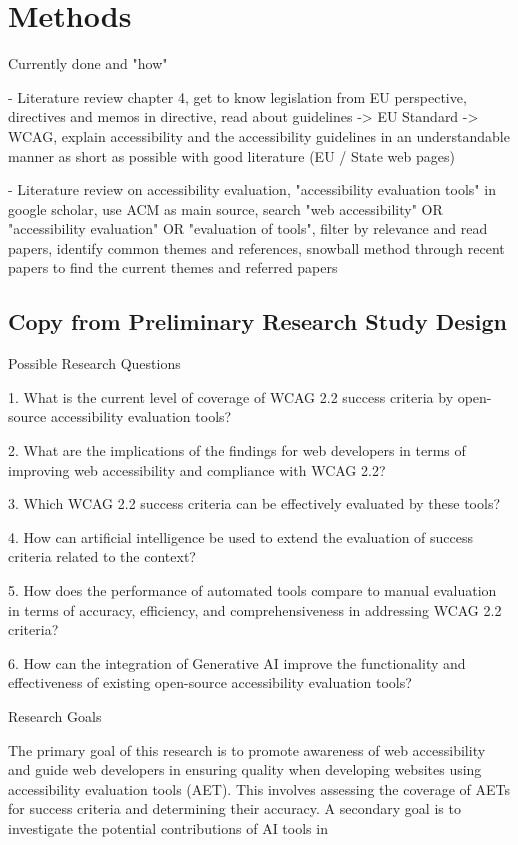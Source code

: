 \chapter{Methods\label{methods}}

Currently done and "how"


- Literature review chapter 4, get to know legislation from EU perspective, directives and memos in directive, read about guidelines -> EU Standard -> WCAG, explain accessibility and the accessibility guidelines in an understandable manner as short as possible with good literature (EU / State web pages)

- Literature review on accessibility evaluation, "accessibility evaluation tools" in google scholar, use ACM as main source, search "web accessibility" OR "accessibility evaluation" OR "evaluation of tools", filter by relevance and read papers, identify common themes and references, snowball method through recent papers to find the current themes and referred papers


\section{Copy from Preliminary Research Study Design}

Possible Research Questions

1. What is the current level of coverage of WCAG 2.2 success criteria by open-source accessibility evaluation tools?

2. What are the implications of the findings for web developers in terms of improving web accessibility and compliance with WCAG 2.2?

3. Which WCAG 2.2 success criteria can be effectively evaluated by these tools?

4. How can artificial intelligence be used to extend the evaluation of success criteria related to the context?

5. How does the performance of automated tools compare to manual evaluation in terms of accuracy, efficiency, and comprehensiveness in addressing WCAG 2.2 criteria?

6. How can the integration of Generative AI improve the functionality and effectiveness of existing open-source accessibility evaluation tools?

Research Goals

The primary goal of this research is to promote awareness of web accessibility and guide web developers in ensuring quality when developing websites using accessibility evaluation tools (AET). This involves assessing the coverage of AETs for success criteria and determining their accuracy. A secondary goal is to investigate the potential contributions of AI tools in

